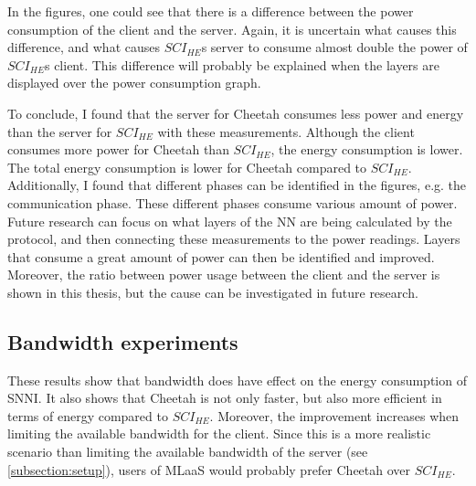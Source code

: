 \documentclass[../thesis.tex]{subfiles}
\begin{document}
In the figures, one could see that there is a difference between the power consumption of the client and the server. Again, it is uncertain what causes this difference, and what causes $SCI_{HE}$s server to consume almost double the power of $SCI_{HE}$s client. This difference will probably be explained when the layers are displayed over the power consumption graph. 

To conclude, I found that the server for Cheetah consumes less power and energy than the server for $SCI_{HE}$ with these measurements. Although the client consumes more power for Cheetah than $SCI_{HE}$, the energy consumption is lower. The total energy consumption is lower for Cheetah compared to $SCI_{HE}$. Additionally, I found that different phases can be identified in the figures, e.g. the communication phase. These different phases consume various amount of power. Future research can focus on what layers of the NN are being calculated by the protocol, and then connecting these measurements to the power readings. Layers that consume a great amount of power can then be identified and improved. Moreover, the ratio between power usage between the client and the server is shown in this thesis, but the cause can be investigated in future research. 

\subsection{Bandwidth experiments}\label{subsection:discuss_bandwidth}
These results show that bandwidth does have effect on the energy consumption of SNNI. It also shows that Cheetah is not only faster, but also more efficient in terms of energy compared to $SCI_{HE}$. Moreover, the improvement increases when limiting the available bandwidth for the client. Since this is a more realistic scenario than limiting the available bandwidth of the server (see \autoref{subsection:setup}), users of MLaaS would probably prefer Cheetah over $SCI_{HE}$.
\end{document}
